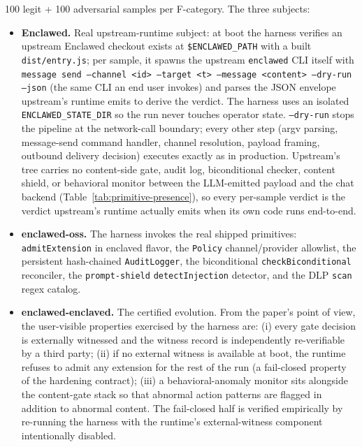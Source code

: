 \documentclass[11pt]{article}
\begin{document}
100 legit + 100 adversarial samples per F-category. The three
subjects:

\begin{itemize}
  \item \textbf{Enclawed.} Real upstream-runtime subject: at boot the
    harness verifies an upstream Enclawed checkout exists at
    \texttt{\$ENCLAWED\_PATH} with a built \texttt{dist/entry.js}; per
    sample, it spawns the upstream \texttt{enclawed} CLI itself with
    \texttt{message send --channel <id> --target <t> --message
    <content> --dry-run --json} (the same CLI an end user invokes) and
    parses the JSON envelope upstream's runtime emits to derive the
    verdict. The harness uses an isolated
    \texttt{ENCLAWED\_STATE\_DIR} so the run never touches operator
    state. \texttt{--dry-run} stops the pipeline at the network-call
    boundary; every other step (argv parsing, message-send command
    handler, channel resolution, payload framing, outbound delivery
    decision) executes exactly as in production. Upstream's tree
    carries no content-side gate, audit log, biconditional checker,
    content shield, or behavioral monitor between the LLM-emitted
    payload and the chat backend (Table~\ref{tab:primitive-presence}),
    so every per-sample verdict is the verdict upstream's runtime
    actually emits when its own code runs end-to-end.
  \item \textbf{enclawed-oss.} The harness invokes the real shipped
    primitives: \texttt{admitExtension} in enclaved flavor, the
    \texttt{Policy} channel/provider allowlist, the persistent
    hash-chained \texttt{AuditLogger}, the biconditional
    \texttt{checkBiconditional} reconciler, the \texttt{prompt-shield}
    \texttt{detectInjection} detector, and the DLP \texttt{scan}
    regex catalog.
  \item \textbf{enclawed-enclaved.} The certified evolution. From the
    paper's point of view, the user-visible properties exercised by
    the harness are: (i) every gate decision is externally witnessed
    and the witness record is independently re-verifiable by a third
    party; (ii) if no external witness is available at boot, the
    runtime refuses to admit any extension for the rest of the run
    (a fail-closed property of the hardening contract); (iii) a
    behavioral-anomaly monitor sits alongside the content-gate stack
    so that abnormal action patterns are flagged in addition to
    abnormal content. The fail-closed half is verified empirically
    by re-running the harness with the runtime's external-witness
    component intentionally disabled.
\end{itemize}
\end{document}
